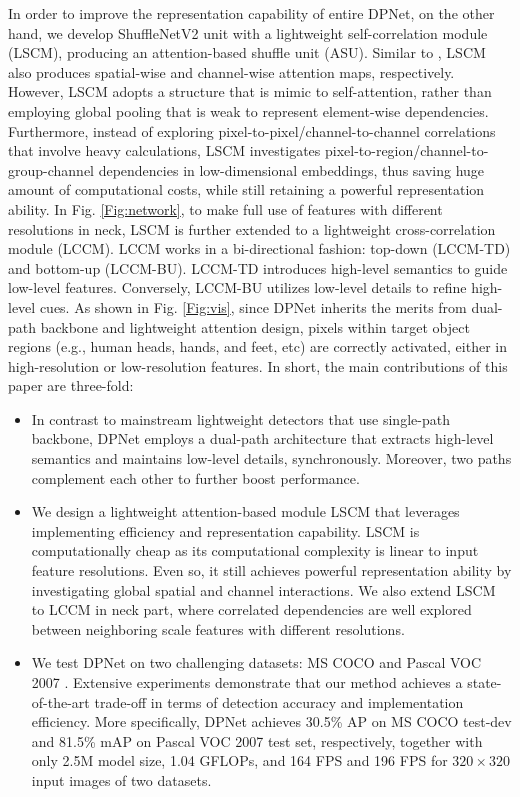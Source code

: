\documentclass[lettersize,journal]{IEEEtran}
\begin{document}
In order to improve the representation capability of entire DPNet, on the other hand, we develop ShuffleNetV2 unit \cite{ma2018shufflenet} with a lightweight self-correlation module (LSCM), producing an attention-based shuffle unit (ASU). Similar to \cite{woo2018cbam,hu2018genet}, LSCM also produces spatial-wise and channel-wise attention maps, respectively. However, LSCM adopts a structure that is mimic to self-attention, rather than employing global pooling that is weak to represent element-wise dependencies. Furthermore, instead of exploring pixel-to-pixel/channel-to-channel correlations \cite{wang2018non,fu2019dual} that involve heavy calculations, LSCM investigates pixel-to-region/channel-to-group-channel dependencies in low-dimensional embeddings, thus saving huge amount of computational costs, while still retaining a powerful representation ability. In Fig. \ref{Fig:network}, to make full use of features with different resolutions in neck, LSCM is further extended to a lightweight cross-correlation module (LCCM). LCCM works in a bi-directional fashion: top-down (LCCM-TD) and bottom-up (LCCM-BU). LCCM-TD introduces high-level semantics to guide low-level features. Conversely, LCCM-BU utilizes low-level details to refine high-level cues. As shown in Fig. \ref{Fig:vis}, since DPNet inherits the merits from dual-path backbone and lightweight attention design, pixels within target object regions (e.g., human heads, hands, and feet, etc) are correctly activated, either in high-resolution or low-resolution features. In short, the main contributions of this paper are three-fold:
\begin{itemize}
	\item In contrast to mainstream lightweight detectors that use single-path backbone, DPNet employs a dual-path architecture that extracts high-level semantics and maintains low-level details, synchronously. Moreover, two paths complement each other to further boost performance. \item We design a lightweight attention-based module LSCM that leverages implementing efficiency and representation capability. LSCM is computationally cheap as its computational complexity is linear to input feature resolutions. Even so, it still achieves powerful representation ability by investigating global spatial and channel interactions. We also extend LSCM to LCCM in neck part, where correlated dependencies are well explored between neighboring scale features with different resolutions. 
	\item We test DPNet on two challenging datasets: MS COCO \cite{lin2014microsoft} and Pascal VOC 2007 \cite{everingham2010pascal}. Extensive experiments demonstrate that our method achieves a state-of-the-art trade-off in terms of detection accuracy and implementation efficiency. More specifically, DPNet achieves 30.5\% AP on MS COCO test-dev and 81.5\% mAP on Pascal VOC 2007 test set, respectively, together with only 2.5M model size, 1.04 GFLOPs, and 164 FPS and 196 FPS for $320 \times 320$ input images of two datasets.
\end{itemize}
\end{document}
